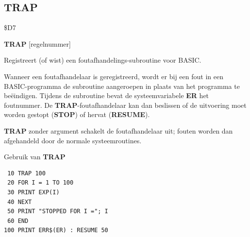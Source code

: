 \subsection{TRAP}
\begin{description}[leftmargin=2cm,style=nextline]
\item [Token:]    \$D7

\item [Formaat:]   {\bf TRAP} [regelnummer]

\item [Gebruik:]    Registreert (of wist) een foutafhandelings-subroutine voor BASIC.

                  Wanneer een foutafhandelaar is geregistreerd, wordt er bij een fout in een BASIC-programma de subroutine aangeroepen in plaats van het programma te beëindigen. Tijdens de subroutine bevat de systeemvariabele {\bf ER} het foutnummer. De {\bf TRAP}-foutafhandelaar kan dan beslissen of de uitvoering moet worden gestopt ({\bf STOP}) of hervat ({\bf RESUME}).

                  {\bf TRAP} zonder argument schakelt de foutafhandelaar uit; fouten worden dan afgehandeld door de normale systeemroutines.

\item [Voorbeeld:]  Gebruik van {\bf TRAP}

\begin{tcolorbox}[colback=black,coltext=white]
\verbatimfont{\codefont}
\begin{verbatim}
 10 TRAP 100
 20 FOR I = 1 TO 100
 30 PRINT EXP(I)
 40 NEXT
 50 PRINT "STOPPED FOR I ="; I
 60 END
100 PRINT ERR$(ER) : RESUME 50
\end{verbatim}
\end{tcolorbox}
\end{description}


\newpage
